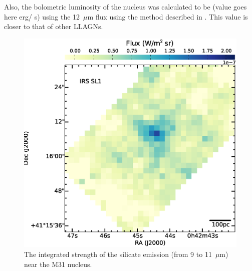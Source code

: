  
Also, the bolometric luminosity of the nucleus was calculated to be (value goes here erg/ s) using the 12~$\mu$m flux using the method described in \citet{luminosity}. This value is closer to that of other LLAGNs.


\begin{figure}
\centering
\includegraphics[scale = 0.3]{./NUCsilicate.eps}
\caption{The integrated strength of the silicate emission (from 9 to 11~$\mu$m) near the M31 nucleus.}
\label{silicate}
\end{figure}
